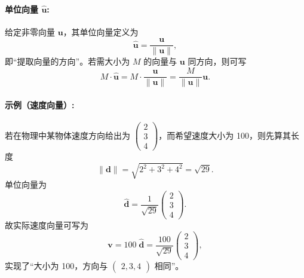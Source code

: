\documentclass[8pt,a4paper,twoside]{tau-class/tau}
\begin{document}
\begin{tcolorbox}[enhanced, breakable, boxsep=1pt, colframe=blue!50!black, colback=white,
  fonttitle=\footnotesize, fontupper=\footnotesize, title style={align=center},
  title=物理中的向量: 方向与大小]
\paragraph{单位向量 \(\hat{\mathbf{u}}\):}
给定非零向量 \(\mathbf{u}\)，其单位向量定义为
\[
\hat{\mathbf{u}} = \frac{\mathbf{u}}{\|\mathbf{u}\|},
\]
即“提取向量的方向”。若需大小为 \(M\) 的向量与 \(\mathbf{u}\) 同方向，则可写
\[
M \cdot \hat{\mathbf{u}}
= M \cdot \frac{\mathbf{u}}{\|\mathbf{u}\|}
= \frac{M}{\|\mathbf{u}\|}\mathbf{u}.
\]

\paragraph{示例（速度向量）:}
若在物理中某物体速度方向给出为 \(\begin{pmatrix}2\\3\\4\end{pmatrix}\)，而希望速度大小为 100，则先算其长度
\[
\|\mathbf{d}\|
= \sqrt{2^2 + 3^2 + 4^2}
= \sqrt{29}.
\]
单位向量为
\[
\hat{\mathbf{d}} = \frac{1}{\sqrt{29}}\begin{pmatrix}2\\3\\4\end{pmatrix}.
\]
故实际速度向量可写为
\[
\mathbf{v} = 100\;\hat{\mathbf{d}}
= \frac{100}{\sqrt{29}} \begin{pmatrix}2\\3\\4\end{pmatrix},
\]
实现了“大小为 100，方向与 \(\begin{pmatrix}2,3,4\end{pmatrix}\) 相同”。
\end{tcolorbox}
\end{document}
